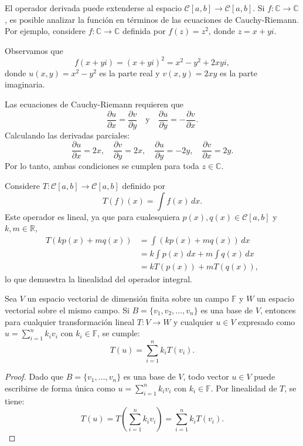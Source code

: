 \begin{rem}
El operador derivada puede extenderse al espacio $\mathcal{C}[a,b] \to \mathcal{C}[a,b]$. Si $f: \mathbb{C} \to \mathbb{C}$, es posible analizar la función en términos de las ecuaciones de Cauchy-Riemann. Por ejemplo, considere $f: \mathbb{C} \to \mathbb{C}$ definida por $f(z) = z^2$, donde $z = x + yi$.

Observamos que
\[
f(x+yi) = (x + yi)^2 = x^2 - y^2 + 2xyi,
\]
donde $u(x,y) = x^2 - y^2$ es la parte real y $v(x,y) = 2xy$ es la parte imaginaria.

Las ecuaciones de Cauchy-Riemann requieren que
\[
\frac{\partial u}{\partial x} = \frac{\partial v}{\partial y} \quad \text{y} \quad \frac{\partial u}{\partial y} = -\frac{\partial v}{\partial x}.
\]
Calculando las derivadas parciales:
\[
\frac{\partial u}{\partial x} = 2x, \quad \frac{\partial v}{\partial y} = 2x, \quad \frac{\partial u}{\partial y} = -2y, \quad \frac{\partial v}{\partial x} = 2y.
\]
Por lo tanto, ambas condiciones se cumplen para toda $z \in \mathbb{C}$.
\end{rem}

\begin{example}
Considere $T: \mathcal{C}[a,b] \to \mathcal{C}[a,b]$ definido por
\[
T(f)(x) = \int f(x)\,dx.
\]
Este operador es lineal, ya que para cualesquiera $p(x), q(x) \in \mathcal{C}[a,b]$ y $k, m \in \mathbb{R}$,
\begin{align*}
    T(kp(x) + m q(x)) &= \int (k p(x) + m q(x))\,dx \\
    &= k \int p(x)\,dx + m \int q(x)\,dx \\
    &= k T(p(x)) + m T(q(x)),
\end{align*}
lo que demuestra la linealidad del operador integral.
\end{example}


\begin{theorem}
Sea $V$ un espacio vectorial de dimensión finita sobre un campo $\mathbb{F}$ y $W$ un espacio vectorial sobre el mismo campo. Si $B = \{v_1, v_2, \ldots, v_n\}$ es una base de $V$, entonces para cualquier transformación lineal $T: V \to W$ y cualquier $u \in V$ expresado como $u = \sum_{i=1}^{n} k_i v_i$ con $k_i \in \mathbb{F}$, se cumple:
\[
T(u) = \sum_{i=1}^{n} k_i T(v_i).
\]
\begin{proof}
Dado que $B = \{v_1, \ldots, v_n\}$ es una base de $V$, todo vector $u \in V$ puede escribirse de forma única como $u = \sum_{i=1}^{n} k_i v_i$ con $k_i \in \mathbb{F}$. Por linealidad de $T$, se tiene:
\[
T(u) = T\left(\sum_{i=1}^{n} k_i v_i\right) = \sum_{i=1}^{n} k_i T(v_i).
\]
\end{proof}
\end{theorem}

